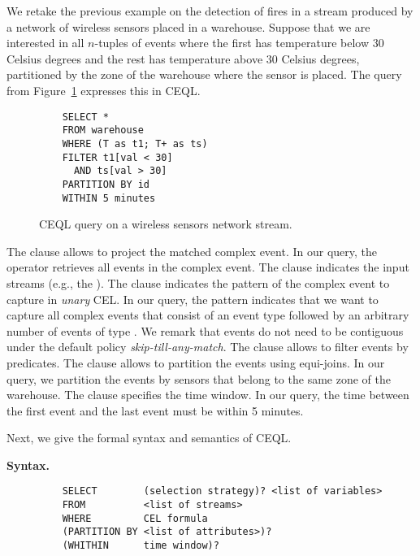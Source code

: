 \begin{example}
We retake the previous example on the detection of fires in a stream produced by a network of wireless sensors placed in a warehouse. Suppose that we are interested in all $n$-tuples of  events where the first has temperature below $30$ Celsius degrees and the rest has temperature above $30$ Celsius degrees, partitioned by the zone of the warehouse where the sensor is placed. The query from Figure~\ref{fig:query:2} expresses this in CEQL.

\begin{figure}[H]
  \begin{verbatim}
    SELECT *
    FROM warehouse
    WHERE (T as t1; T+ as ts)
    FILTER t1[val < 30]
      AND ts[val > 30]
    PARTITION BY id
    WITHIN 5 minutes
  \end{verbatim}
  \caption{CEQL query on a wireless sensors network stream.}
  \label{fig:query:2}
\end{figure}

The  clause allows to project the matched complex event. In our query, the \code{*} operator retrieves all events in the complex event. The  clause indicates the input streams (e.g., the ). The  clause indicates the pattern of the complex event to capture in \emph{unary} CEL. In our query, the pattern  indicates that we want to capture all complex events that consist of an event type  followed by an arbitrary number of events of type . We remark that events do not need to be contiguous under the default policy \emph{skip-till-any-match}. The  clause allows to filter events by predicates. The clause  allows to partition the events using equi-joins. In our query, we partition the events by sensors that belong to the same zone of the warehouse. The  clause specifies the time window. In our query, the time between the first event  and the last event  must be within 5 minutes.
\end{example}

\newpage

Next, we give the formal syntax and semantics of CEQL.

\textbf{Syntax.}

\begin{figure}[H]
  \begin{verbatim}
    SELECT        (selection strategy)? <list of variables>
    FROM          <list of streams>
    WHERE         CEL formula
    (PARTITION BY <list of attributes>)?
    (WHITHIN      time window)?
  \end{verbatim}
\end{figure}

